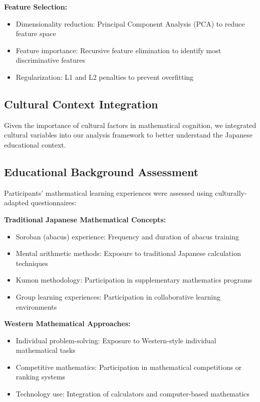 \documentclass[12pt, a4paper]{article}
\begin{document}
\noindent
\textbf{Feature Selection:}
\begin{itemize}
\item Dimensionality reduction: Principal Component Analysis (PCA) to reduce feature space
\item Feature importance: Recursive feature elimination to identify most discriminative features
\item Regularization: L1 and L2 penalties to prevent overfitting
\end{itemize}


\subsection{Cultural Context Integration}
Given the importance of cultural factors in mathematical cognition, we integrated cultural variables into our analysis framework to better understand the Japanese educational context.

\subsection{Educational Background Assessment}
Participants' mathematical learning experiences were assessed using culturally-adapted questionnaires:

\vspace{0.5\baselineskip}
\noindent
\textbf{Traditional Japanese Mathematical Concepts:}
\begin{itemize}
\item Soroban (abacus) experience: Frequency and duration of abacus training
\item Mental arithmetic methods: Exposure to traditional Japanese calculation techniques
\item Kumon methodology: Participation in supplementary mathematics programs
\item Group learning experiences: Participation in collaborative learning environments
\end{itemize}

\noindent
\textbf{Western Mathematical Approaches:}
\begin{itemize}
\item Individual problem-solving: Exposure to Western-style individual mathematical tasks
\item Competitive mathematics: Participation in mathematical competitions or ranking systems
\item Technology use: Integration of calculators and computer-based mathematics
\end{itemize}
\end{document}

